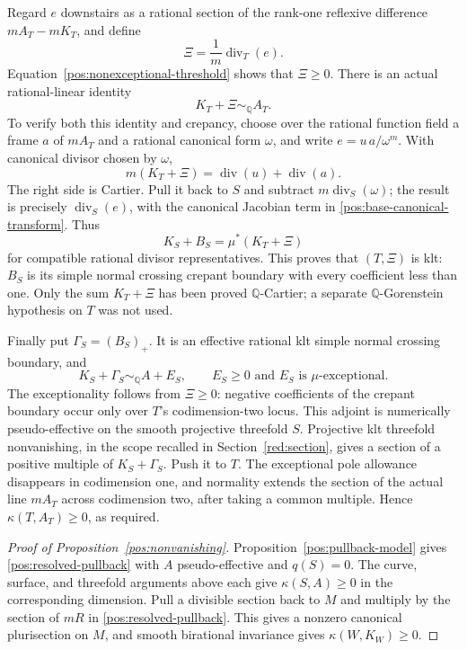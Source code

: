 \documentclass[11pt,letterpaper]{article}
\newcommand{\Q}{\mathbb{Q}}
\DeclareMathOperator{\divisor}{div}
\theoremstyle{definition}
\theoremstyle{remark}
\begin{document}
Regard \(e\) downstairs as a rational section of the rank-one
reflexive difference \(mA_T-mK_T\), and define
\begin{equation}\label{pos:base-boundary}
 \Xi=\frac1m\divisor_T(e).
\end{equation}
Equation~\eqref{pos:nonexceptional-threshold} shows that
\(\Xi\geq0\). There is an actual rational-linear identity
\begin{equation}\label{pos:base-adjoint}
 K_T+\Xi\sim_{\Q}A_T.
\end{equation}
To verify both this identity and crepancy, choose over the rational
function field a frame \(a\) of \(mA_T\) and a rational canonical
form \(\omega\), and write \(e=u\,a/\omega^m\). With canonical
divisor chosen by \(\omega\),
\[
 m(K_T+\Xi)=\divisor(u)+\divisor(a).
\]
The right side is Cartier. Pull it back to \(S\) and subtract
\(m\divisor_S(\omega)\); the result is precisely
\(\divisor_S(e)\), with the canonical Jacobian term in
\eqref{pos:base-canonical-transform}. Thus
\begin{equation}\label{pos:actual-crepant-identity}
 K_S+B_S=\mu^*(K_T+\Xi)
\end{equation}
for compatible rational divisor representatives. This proves that
\((T,\Xi)\) is klt: \(B_S\) is its simple normal crossing crepant
boundary with every coefficient less than one. Only the sum
\(K_T+\Xi\) has been proved \(\Q\)-Cartier; a separate
\(\Q\)-Gorenstein hypothesis on \(T\) was not used.

Finally put \(\Gamma_S=(B_S)_+\). It is an effective rational klt
simple normal crossing boundary, and
\[
 K_S+\Gamma_S\sim_{\Q}A+E_S,
 \qquad E_S\geq0\text{ and }E_S\text{ is }\mu\text{-exceptional}.
\]
The exceptionality follows from \(\Xi\geq0\): negative coefficients
of the crepant boundary occur only over \(T\)'s codimension-two
locus. This adjoint is numerically pseudo-effective on the smooth
projective threefold \(S\). Projective klt threefold nonvanishing,
in the scope recalled in Section~\ref{red:section}, gives a section
of a positive multiple of \(K_S+\Gamma_S\). Push it to \(T\).
The exceptional pole allowance disappears in codimension one, and
normality extends the section of the actual line \(mA_T\) across
codimension two, after taking a common multiple. Hence
\(\kappa(T,A_T)\geq0\), as required.

\begin{proof}[Proof of Proposition~\ref{pos:nonvanishing}]
Proposition~\ref{pos:pullback-model} gives
\eqref{pos:resolved-pullback} with \(A\) pseudo-effective and
\(q(S)=0\). The curve, surface, and threefold arguments above each
give \(\kappa(S,A)\geq0\) in the corresponding dimension. Pull a
divisible section back to \(M\) and multiply by the section of
\(mR\) in \eqref{pos:resolved-pullback}. This gives a nonzero
canonical plurisection on \(M\), and smooth birational invariance
gives \(\kappa(W,K_W)\geq0\).
\end{proof}
\end{document}
